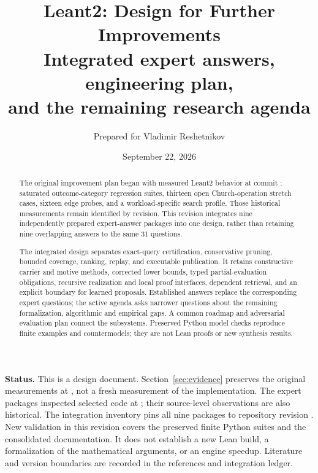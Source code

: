 
\newcommand{\cls}[1]{\textsf{\small[#1]}}
\newcommand{\WI}[1]{\textbf{#1}}
\newcommand{\lam}{\ensuremath{\lambda}}

\title{\textbf{Leant2: Design for Further Improvements}\\[6pt]
\large Integrated expert answers, engineering plan,\\
and the remaining research agenda}
\author{Prepared for Vladimir Reshetnikov}
\date{September 22, 2026}


\maketitle

\begin{abstract}
The original improvement plan began with measured Leant2 behavior at commit
: saturated outcome-category regression suites, thirteen open
Church-operation stretch cases, sixteen edge probes, and a workload-specific
search profile. Those historical measurements remain identified by revision.
This revision integrates nine independently prepared expert-answer packages
into one design, rather than retaining nine overlapping answers to the same
31 questions.

The integrated design separates exact-query certification, conservative
pruning, bounded coverage, ranking, replay, and executable publication. It
retains constructive carrier and motive methods, corrected lower bounds,
typed partial-evaluation obligations, recursive realization and local proof
interfaces, dependent retrieval, and an explicit boundary for learned
proposals. Established answers replace the corresponding expert questions;
the active agenda asks narrower questions about the remaining formalization,
algorithmic and empirical gaps. A common roadmap and adversarial evaluation
plan connect the subsystems. Preserved Python model checks reproduce finite
examples and countermodels; they are not Lean proofs or new synthesis results.
\end{abstract}

\vspace{4pt}
\textbf{Status.} This is a design document. Section~\ref{sec:evidence} preserves
the original measurements at , not a fresh measurement of the
implementation. The expert packages inspected selected code at
; their source-level observations are also historical. The
integration inventory pins all nine packages to repository revision
. New validation in this revision covers the preserved finite
Python suites and the consolidated documentation. It does not establish a
new Lean build, a formalization of the mathematical arguments, or an engine
speedup. Literature and version boundaries are recorded in the references
and integration ledger.

